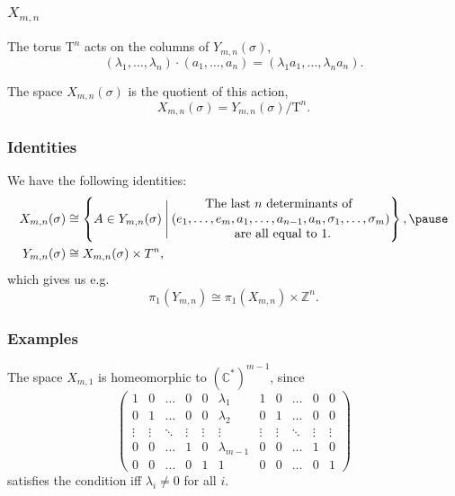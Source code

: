 \documentclass{beamer} %
\newcommand{\Z}{\mathbb{Z}}
\newcommand{\C}{\mathbb{C}}
\newcommand{\delim}{\:}
\newcommand{\T}{\mathrm{T}}
\newcommand{\set}[1]{\left\{ #1 \right\}}
\renewcommand{\l}{\lambda}
\begin{document}
\begin{frame}
  \frametitle{$X_{m,n}$}
  The torus $\T^n$ acts on the columns of $Y_{m,n}(\sigma)$,
  \[ (\l_1,\dots,\l_n) \cdot (a_1,\dots,a_n) = (\l_1 a_1,\dots, \l_n
  a_n). \]
  \pause
  \begin{definition}
    The space $X_{m,n}(\sigma)$ is the quotient of this action,
    \[ X_{m,n}(\sigma) = Y_{m,n}(\sigma) / \T^n. \]
  \end{definition}
\end{frame}

\begin{frame}
  \frametitle{Identities}
  We have the following identities:
  \begin{align*}
    X_{m,n}(\sigma) &\cong \set{ A \in Y_{m,n}(\sigma)
                      \delim\Bigg\vert\delim
                      \begin{matrix}
                                  \text{The last } n \text{
                                    determinants of } \\ 
                                  (e_1,\dots,e_m,a_1,\dots,a_{n-1},a_n,
                                  \sigma_1,\dots,\sigma_m) \\
                                  \text{ are all equal to 1.}
                      \end{matrix} }, \pause \\
    Y_{m,n}(\sigma) &\cong X_{m,n}(\sigma)\times T^n,
  \end{align*}
  which gives us e.g.
  \[ \pi_1(Y_{m,n}) \cong \pi_1(X_{m,n})\times \Z^n. \]
\end{frame}

\begin{frame}
  \frametitle{Examples}
    \begin{example}
    The space $X_{m,1}$ is homeomorphic to $(\C^*)^{m-1}$,
    since
    \[ \begin{pmatrix}
      1&0&\dots&0&0&\l_1&1&0&\dots&0&0 \\
      0&1&\dots&0&0&\l_2&0&1&\dots&0&0 \\
      \vdots&\vdots&\ddots&\vdots&\vdots&\vdots&\vdots&\vdots&
      \ddots&\vdots&\vdots\\
      0&0&\dots&1&0&\l_{m-1}&0&0&\dots&1&0 \\
      0&0&\dots&0&1&1&0&0&\dots&0&1
    \end{pmatrix} \]
    satisfies the condition iff $\l_i \neq 0$ for all $i$.
  \end{example}
\end{frame}
\end{document}
